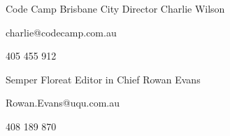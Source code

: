 


\begin{cventries}


\cventry
{Code Camp Brisbane City Director} %
{Charlie Wilson} %
{} %
{} %
{ %
\begin{cvitems}
\item charlie@codecamp.com.au
\item 405 455 912
\end{cvitems}
}


\cventry
{Semper Floreat Editor in Chief} %
{Rowan Evans} %
{} %
{} %
{ %
\begin{cvitems}
\item Rowan.Evans@uqu.com.au
\item 408 189 870
\end{cvitems}
}


\end{cventries}